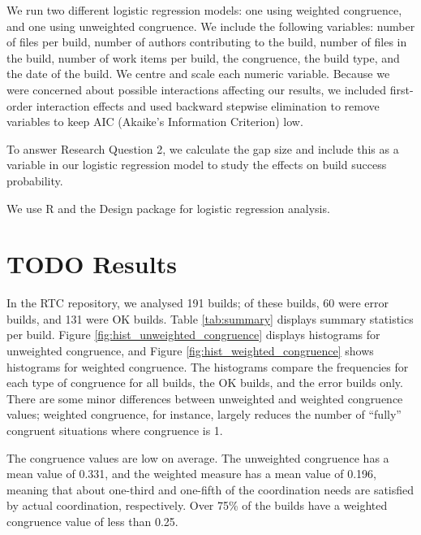 We run two different logistic regression models: one using weighted congruence, and one using unweighted congruence. We include the following variables: number of files per build, number of authors contributing to the build, number of files in the build, number of work items per build, the congruence, the build type, and the date of the build. We centre and scale each numeric variable.
Because we were concerned about possible interactions affecting our results, we included first-order interaction effects and used backward stepwise elimination to remove variables to keep AIC (Akaike's Information Criterion) low.

To answer Research Question 2, we calculate the gap size and include this as a variable in our logistic regression model to study the effects on build success probability.

We use R \cite{R} and the Design package \cite{designR} for logistic regression analysis.


\section{TODO Results}
\label{sec:results}
In the RTC repository, we analysed 191 builds; of these builds, 60 were error builds, and 131 were OK builds. Table \ref{tab:summary} displays summary statistics per build.
Figure \ref{fig:hist_unweighted_congruence} displays histograms for unweighted congruence, and Figure \ref{fig:hist_weighted_congruence} shows histograms for weighted congruence. The histograms compare the frequencies for each type of congruence for all builds, the OK builds, and the error builds only. There are some minor differences between unweighted and weighted congruence values; weighted congruence, for instance, largely reduces the number of ``fully'' congruent situations where congruence is 1.

The congruence values are low on average. The unweighted congruence has a mean value of 0.331, and the weighted measure has a mean value of 0.196, meaning that about one-third and one-fifth of the coordination needs are satisfied by actual coordination, respectively. Over 75\% of the builds have a weighted congruence value of less than 0.25.

